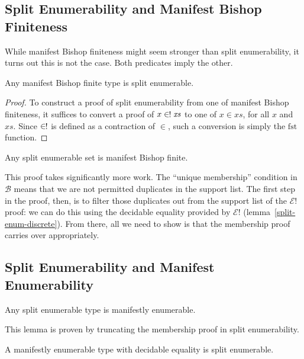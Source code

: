 \subsection{Split Enumerability and Manifest Bishop Finiteness}
While manifest Bishop finiteness might seem stronger than split enumerability,
it turns out this is not the case.
Both predicates imply the other.
\begin{lemma} \label{manifest-bishop-to-split-enum}
  Any manifest Bishop finite type is split enumerable.
\end{lemma}
\begin{proof}
  To construct a proof of split enumerability from one of manifest Bishop
  finiteness, it suffices to convert a proof of \(x \inunique \mathit{xs}\) to
  one of \(x \in \mathit{xs}\), for all \(x\) and \(\mathit{xs}\).
  Since \(\inunique\) is defined as a contraction of \(\in\), such a conversion
  is simply the \(\text{fst}\) function.
\end{proof}

\begin{lemma} \label{split-enum-to-manifest-bishop}
  Any split enumerable set is manifest Bishop finite.
\end{lemma}
This proof takes significantly more work.
The ``unique membership'' condition in \(\mathcal{B}\) means that we are not
permitted duplicates in the support list.
The first step in the proof, then, is to filter those duplicates out from the
support list of the \(\mathcal{E}!\) proof: we can do this using the decidable
equality provided by \(\mathcal{E}!\) (lemma~\ref{split-enum-discrete}).
From there, all we need to show is that the membership proof carries over
appropriately.
\subsection{Split Enumerability and Manifest Enumerability}
\begin{lemma} \label{split-enum-to-manifest-enum}
  Any split enumerable type is manifestly enumerable.
\end{lemma}
This lemma is proven by truncating the membership proof in split enumerability.

\begin{lemma} \label{manifest-enum-to-split-enum}
  A manifestly enumerable type with decidable equality is split enumerable.
\end{lemma}


